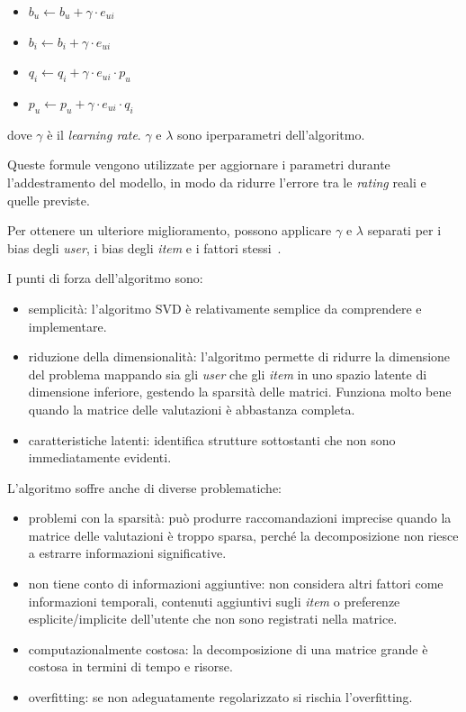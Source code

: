 \begin{itemize}
    \item $b_u \leftarrow b_u + \gamma \cdot e_{ui}$
    \item $b_i \leftarrow b_i + \gamma \cdot e_{ui}$
    \item $q_i \leftarrow q_i + \gamma \cdot e_{ui} \cdot p_u$
    \item $p_u \leftarrow p_u + \gamma \cdot e_{ui} \cdot q_i$
\end{itemize}

dove $\gamma$ è il \textit{learning rate}. $\gamma$ e $\lambda$ sono iperparametri dell'algoritmo.

Queste formule vengono utilizzate per aggiornare i parametri durante l'addestramento del modello, in modo da ridurre l'errore tra le
\textit{rating} reali e quelle previste.

Per ottenere un ulteriore miglioramento, possono applicare $\gamma$ e $\lambda$ separati per i bias degli \textit{user}, i bias degli
\textit{item} e i fattori stessi~\cite{SVD_optimized}.

I punti di forza dell'algoritmo sono:

\begin{itemize}
    \item semplicità: l'algoritmo SVD è relativamente semplice da comprendere e implementare.
    \item riduzione della dimensionalità: l'algoritmo permette di ridurre la dimensione del problema mappando sia gli \textit{user} che gli \textit{item} in uno spazio latente di dimensione inferiore, gestendo la sparsità delle matrici. Funziona molto bene quando la matrice delle valutazioni è abbastanza completa. \item caratteristiche latenti: identifica strutture sottostanti che non sono immediatamente evidenti.
\end{itemize}

L'algoritmo soffre anche di diverse problematiche:

\begin{itemize}
    \item problemi con la sparsità: può produrre raccomandazioni imprecise quando la matrice delle valutazioni è troppo sparsa, perché la decomposizione non riesce a estrarre informazioni significative. 
    \item non tiene conto di informazioni aggiuntive: non considera altri fattori come informazioni temporali, contenuti aggiuntivi sugli \textit{item} o preferenze esplicite/implicite dell'utente che non sono registrati nella matrice.
    \item computazionalmente costosa: la decomposizione di una matrice grande è costosa in termini di tempo e risorse.
    \item overfitting: se non adeguatamente regolarizzato si rischia l'overfitting.
\end{itemize}

